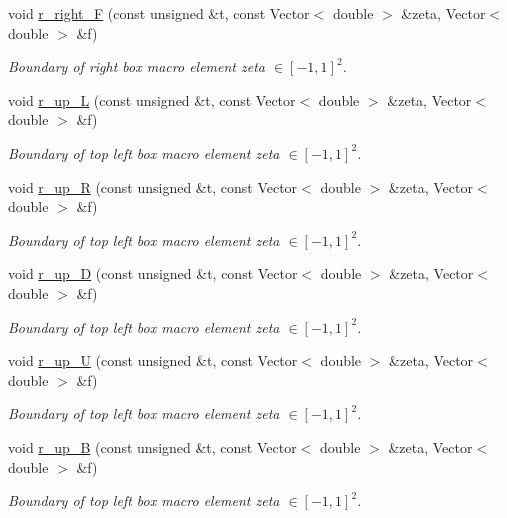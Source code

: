 \begin{DoxyCompactItemize}
void \hyperlink{classoomph_1_1EighthSphereDomain_aa08635438bff5a3d377d45c8c9c2b377}{r\+\_\+right\+\_\+F} (const unsigned \&t, const Vector$<$ double $>$ \&zeta, Vector$<$ double $>$ \&f)
\begin{DoxyCompactList}\small\item\em Boundary of right box macro element zeta $ \in [-1,1]^2 $. \end{DoxyCompactList}\item 
void \hyperlink{classoomph_1_1EighthSphereDomain_af9ab515958ed3699ea5ed95ec9a87d9e}{r\+\_\+up\+\_\+L} (const unsigned \&t, const Vector$<$ double $>$ \&zeta, Vector$<$ double $>$ \&f)
\begin{DoxyCompactList}\small\item\em Boundary of top left box macro element zeta $ \in [-1,1]^2 $. \end{DoxyCompactList}\item 
void \hyperlink{classoomph_1_1EighthSphereDomain_ad38d27ad06d83c94c768fbda98c939e7}{r\+\_\+up\+\_\+R} (const unsigned \&t, const Vector$<$ double $>$ \&zeta, Vector$<$ double $>$ \&f)
\begin{DoxyCompactList}\small\item\em Boundary of top left box macro element zeta $ \in [-1,1]^2 $. \end{DoxyCompactList}\item 
void \hyperlink{classoomph_1_1EighthSphereDomain_ad55bde69a74b24f1c9c6cc6bb277e39b}{r\+\_\+up\+\_\+D} (const unsigned \&t, const Vector$<$ double $>$ \&zeta, Vector$<$ double $>$ \&f)
\begin{DoxyCompactList}\small\item\em Boundary of top left box macro element zeta $ \in [-1,1]^2 $. \end{DoxyCompactList}\item 
void \hyperlink{classoomph_1_1EighthSphereDomain_a303c406fe673675f497522dae69f849c}{r\+\_\+up\+\_\+U} (const unsigned \&t, const Vector$<$ double $>$ \&zeta, Vector$<$ double $>$ \&f)
\begin{DoxyCompactList}\small\item\em Boundary of top left box macro element zeta $ \in [-1,1]^2 $. \end{DoxyCompactList}\item 
void \hyperlink{classoomph_1_1EighthSphereDomain_aaac560ab6bbe35010c1ff61a466d1252}{r\+\_\+up\+\_\+B} (const unsigned \&t, const Vector$<$ double $>$ \&zeta, Vector$<$ double $>$ \&f)
\begin{DoxyCompactList}\small\item\em Boundary of top left box macro element zeta $ \in [-1,1]^2 $. \end{DoxyCompactList}\item 

\end{DoxyCompactItemize}
